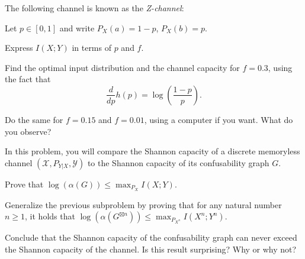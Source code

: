\documentclass[a4paper,10pt,landscape,twocolumn]{scrartcl}
\begin{document}
\begin{exercise}[Z-channel]
The following channel is known as the \emph{Z-channel}:
\begin{center}
\end{center}
Let $p \in [0,1]$ and write $P_X(a) = 1-p$, $P_X(b) = p$.

\begin{subex}
Express $I(X;Y)$ in terms of $p$ and $f$.
\end{subex}

\begin{subex}
Find the optimal input distribution and the channel capacity for $f = 0.3$, using the fact that
\[
\frac{d}{dp} h(p) = \log\left(\frac{1-p}{p}\right).
\]
\end{subex}
\begin{subex}
Do the same for $f = 0.15$ and $f = 0.01$, using a computer if you want. What do you observe?
\end{subex}
\end{exercise}

\begin{exercise}
In this problem, you will compare the Shannon capacity of a discrete memoryless channel $(\mathcal{X},P_{Y|X},\mathcal{Y})$ to the Shannon capacity of its confusability graph $G$.

\begin{subex}
Prove that $\log(\alpha(G)) \leq \max_{P_X} I(X;Y)$.
\end{subex}
\begin{subex}
Generalize the previous subproblem by proving that for any natural number $n \geq 1$, it holds that $\log(\alpha(G^{\boxtimes n})) \leq \max_{P_{X^n}} I(X^n;Y^n)$.
\end{subex}
\begin{subex}
Conclude that the Shannon capacity of the confusability graph can never exceed the Shannon capacity of the channel. Is this result surprising? Why or why not?
\end{subex}
\end{exercise}
\end{document}
